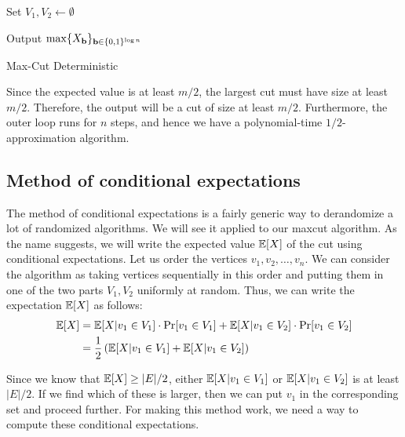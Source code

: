 \begin{algorithm}
	
	Set $V_1, V_2 \gets \emptyset$
	
	
	Output $\max \{X_{\mathbf{b}}\}_{\mathbf{b} \in \{0,1\}^{\log n}}$

	\caption{Max-Cut Deterministic}
	\label{alg:maxcut-det}
\end{algorithm}

Since the expected value is at least $m/2$, the largest cut must have size at least $m/2$. Therefore, the output will be a cut of size at least $m/2$. Furthermore, the outer loop runs for $n$ steps, and hence we have a polynomial-time $1/2$-approximation algorithm.

\subsection{Method of conditional expectations}

The method of conditional expectations is a fairly generic way to derandomize a
lot of randomized algorithms. We will see it applied to our maxcut algorithm. As
the name suggests, we will write the expected value $\mathbb{E}[X]$ of the cut using
conditional expectations. Let us order the vertices $v_1, v_2, \ldots, v_n$. We
can consider the algorithm as taking vertices sequentially in this order and
putting them in one of the two parts $V_1, V_2$ uniformly at random. Thus, we can write the expectation $\mathbb{E}[X]$ as follows:
\begin{align*}
  \mathbb{E}[X] &= \mathbb{E}[X|v_1 \in V_1]\cdot \Pr[v_1 \in V_1] + \mathbb{E}[X|v_1 \in V_2]\cdot \Pr[v_1\in V_2]\\
  &= \frac{1}{2} \left( \mathbb{E}[X|v_1 \in V_1] + \mathbb{E}[X|v_1 \in V_2] \right)
\end{align*}

Since we know that $\mathbb{E}[X] \geq |E|/2$, either $\mathbb{E}[X|v_1\in V_1]$ or
$\mathbb{E}[X|v_1\in V_2]$ is at least $|E|/2$. If we find which of these is larger,
then we can put $v_1$ in the corresponding set and proceed further.
For making this method work, we need a way to compute these
conditional expectations.

